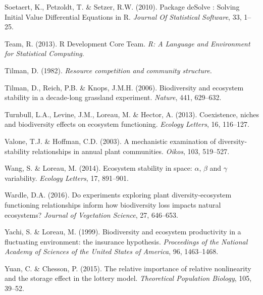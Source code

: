\documentclass[12pt,]{article}
\begin{document}
\hypertarget{ref-Soetaert2010}{}
Soetaert, K., Petzoldt, T. \& Setzer, R.W. (2010). Package deSolve :
Solving Initial Value Differential Equations in R. \emph{Journal Of
Statistical Software}, 33, 1--25.

\hypertarget{ref-Team2013}{}
Team, R. (2013). R Development Core Team. \emph{R: A Language and
Environment for Statistical Computing}.

\hypertarget{ref-Tilman1982}{}
Tilman, D. (1982). \emph{Resource competition and community structure.}

\hypertarget{ref-Tilman2006}{}
Tilman, D., Reich, P.B. \& Knops, J.M.H. (2006). Biodiversity and
ecosystem stability in a decade-long grassland experiment.
\emph{Nature}, 441, 629--632.

\hypertarget{ref-Turnbull2013}{}
Turnbull, L.A., Levine, J.M., Loreau, M. \& Hector, A. (2013).
Coexistence, niches and biodiversity effects on ecosystem functioning.
\emph{Ecology Letters}, 16, 116--127.

\hypertarget{ref-Valone2003}{}
Valone, T.J. \& Hoffman, C.D. (2003). A mechanistic examination of
diversity-stability relationships in annual plant communities.
\emph{Oikos}, 103, 519--527.

\hypertarget{ref-Wang2014}{}
Wang, S. \& Loreau, M. (2014). Ecosystem stability in space: \(\alpha\),
\(\beta\) and \(\gamma\) variability. \emph{Ecology Letters}, 17,
891--901.

\hypertarget{ref-Wardle2016}{}
Wardle, D.A. (2016). Do experiments exploring plant diversity-ecosystem
functioning relationships inform how biodiversity loss impacts natural
ecosystems? \emph{Journal of Vegetation Science}, 27, 646--653.

\hypertarget{ref-Yachi1999}{}
Yachi, S. \& Loreau, M. (1999). Biodiversity and ecosystem productivity
in a fluctuating environment: the insurance hypothesis.
\emph{Proceedings of the National Academy of Sciences of the United
States of America}, 96, 1463--1468.

\hypertarget{ref-Yuan2015}{}
Yuan, C. \& Chesson, P. (2015). The relative importance of relative
nonlinearity and the storage effect in the lottery model.
\emph{Theoretical Population Biology}, 105, 39--52.
\end{document}
